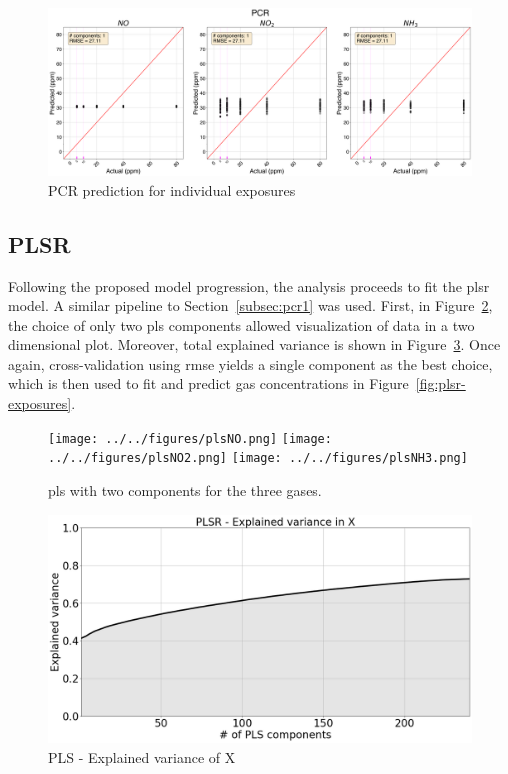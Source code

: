 \begin{figure}[h]
	\centering
	\includegraphics[width=1\textwidth]{../figures/pcr-exposures.png}
	\caption{PCR prediction for individual exposures}
	\label{fig:pcr-exposures}
\end{figure}

\newpage
\subsection{PLSR}

Following the proposed model progression, the analysis proceeds to fit the \acrshort{plsr} model. A similar pipeline to Section~\ref{subsec:pcr1} was used. First, in Figure~\ref{fig:pls}, the choice of only two \acrshort{pls} components allowed visualization of data in a two dimensional plot. Moreover, total explained variance is shown in Figure~\ref{fig:pls-exp-var}. Once again, cross-validation using \acrshort{rmse} yields a single component as the best choice, which is then used to fit and predict gas concentrations in Figure~\ref{fig:plsr-exposures}.

\begin{figure}[!htb]
	\centering
	\texttt{[image: ../../figures/plsNO.png]}
	\hfill
	\texttt{[image: ../../figures/plsNO2.png]}
	\hfill
	\texttt{[image: ../../figures/plsNH3.png]}
	\caption{\acrshort{pls} with two components for the three gases.}
	\label{fig:pls}
\end{figure}

\begin{figure}[h]
	\centering
	\includegraphics[width=1\textwidth]{../figures/pls-explained-variance.png}
	\caption{PLS - Explained variance of X}
	\label{fig:pls-exp-var}
\end{figure}

